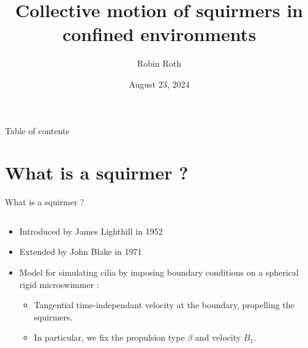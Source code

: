 \documentclass{beamer}
\title{Collective motion of squirmers in conﬁned
environments}
\author{Robin Roth}
\institute{Supervised by: Van Landeghem Céline, Giraldi Laetitia, Agathe Chouippe}
\date{August 23, 2024}
\begin{document}
\begin{frame}
    \titlepage
\end{frame}

\begin{frame}{Table of contents}
    \tableofcontents
\end{frame}

\section{What is a squirmer ?}
\begin{frame}{What is a squirmer ?}
    \begin{columns}[T]
        \begin{column}{0.5\textwidth}
            \begin{itemize}
                \item Introduced by James Lighthill in 1952 \cite{Wikipedia}
                \item Extended by John Blake in 1971 \cite{Wikipedia}
                \item Model for simulating cilia by imposing boundary conditions on a spherical rigid microswimmer :
                \begin{itemize}
                    \item Tangential time-independant velocity at the boundary, propelling the squirmers.
                    \item In particular, we fix the propulsion type $\beta$ and velocity $B_1$.
                \end{itemize}
            \end{itemize}
        \end{column}
        \begin{column}{0.5\textwidth}
            \centering

\end{column}
\end{columns}
\end{frame}
\end{document}
